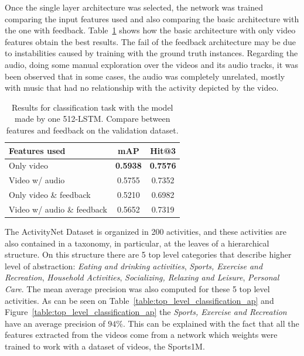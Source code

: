 Once the single layer architecture was selected, the network was trained comparing the input features used and also comparing the basic architecture with the one with feedback.  Table~\ref{table:classification_by_features} shows how the basic architecture  with only video features obtain the best results.
The fail of the feedback architecture may be due to instabilities caused by  training with the ground truth instances\cite{}.%
Regarding the audio, doing some manual exploration over the videos and its audio tracks, it was been observed that in some cases, the audio was completely unrelated, mostly with music that had no relationship with the activity depicted by the video. 

\begin{table}[H]
\begin{center}
\begin{tabular}{|l|c|c|}
\hline
Features used & mAP & Hit@3 \\
\hline\hline
Only video & \bf0.5938 & \bf0.7576 \\
Video w/ audio & 0.5755 & 0.7352 \\
Only video \& feedback & 0.5210 & 0.6982 \\
Video w/ audio \& feedback & 0.5652 & 0.7319 \\
\hline
\end{tabular}
\end{center}
\caption{Results for classification task with the model made by one 512-LSTM. Compare between
         features and feedback on the validation dataset.}
\label{table:classification_by_features}
\end{table}

The ActivityNet Dataset is organized in 200 activities, and these activities are also contained in a taxonomy, in particular, at the leaves of a hierarchical structure. 
On this structure there are 5 top level categories that describe higher level of abstraction: \textit{Eating and drinking activities}, \textit{Sports, Exercise and Recreation}, \textit{Household Activities}, \textit{Socializing, Relaxing and Leisure}, \textit{Personal Care}.
The mean average precision was also computed for these 5 top level activities. 
As can be seen on Table~\ref{table:top_level_classification_ap} and Figure~\ref{table:top_level_classification_ap} the \textit{Sports, Exercise and Recreation} have an average precision of $94\%$. This can be explained with the fact that all the features extracted from the videos come from a network which weights were trained to work with a dataset of videos, the Sports1M\cite{KarpathyCVPR14}.

